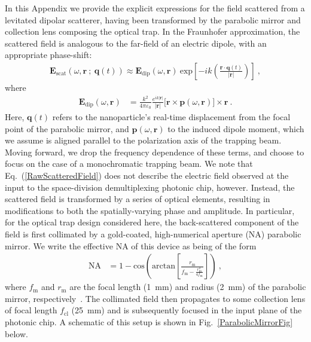 \documentclass[%
 reprint,
 amsmath,amssymb,
 aps,
pra,
]{revtex4-2}
\begin{document}
\noindent In this Appendix we provide the explicit expressions for the field scattered from a levitated dipolar scatterer, having been transformed by the parabolic mirror and collection lens composing the optical trap. In the Fraunhofer approximation, the scattered field is analogous to the far-field of an electric dipole, with an appropriate phase-shift:
\begin{align}\label{RawScatteredField}
    \boldsymbol{E}_{\mathrm{scat}}(\omega, \boldsymbol{r} ~;~ \boldsymbol{q}(t)) \approx \boldsymbol{E}_{\mathrm{dip}}(\omega, \boldsymbol{r})~\mathrm{exp}\left[-ik\left(\frac{\boldsymbol{r}\cdot\boldsymbol{q}(t)}{|\boldsymbol{r}|}\right)\right] ~ ,
\end{align}
where
\begin{align}
    \boldsymbol{E}_{\mathrm{dip}}(\omega, \boldsymbol{r}) &= \frac{k^{2}}{4\pi\varepsilon_{0}} \frac{e^{ik|\boldsymbol{r}|}}{|\boldsymbol{r}|}\big[\boldsymbol{r}\times\boldsymbol{p}(\omega, \boldsymbol{r})\big]\times\boldsymbol{r} ~ .
\end{align}
Here, $\boldsymbol{q}(t)$ refers to the nanoparticle's real-time displacement from the focal point of the parabolic mirror, and $\boldsymbol{p}(\omega, \boldsymbol{r})$ to the induced dipole moment, which we assume is aligned parallel to the polarization axis of the trapping beam. Moving forward, we drop the frequency dependence of these terms, and choose to focus on the case of a monochromatic trapping beam. We note that Eq.~(\ref{RawScatteredField}) does not describe the electric field observed at the input to the space-division demultiplexing photonic chip, however. Instead, the scattered field is transformed by a series of optical elements, resulting in modifications to both the spatially-varying phase and amplitude. In particular, for the optical trap design considered here, the back-scattered component of the field is first collimated by a gold-coated, high-numerical aperture (NA) parabolic mirror. We write the effective NA of this device as being of the form
\begin{align}
    \mathrm{NA} &= 1 - \mathrm{cos}\left(\mathrm{arctan}\left[\frac{r_{\mathrm{m}}}{f_{\mathrm{m}} - \frac{r_{\mathrm{m}}^{2}}{4f_{\mathrm{m}}}}\right]\right) ~ , 
\end{align}
where $f_{\mathrm{m}}$ and $r_{\mathrm{m}}$ are the focal length (1~mm) and radius (2~mm) of the parabolic mirror, respectively~\cite{vovrosh_parametric_2017}. The collimated field then propagates to some collection lens of focal length $f_{\mathrm{cl}}$ (25~mm) and is subsequently focused in the input plane of the photonic chip. A schematic of this setup is shown in Fig.~\ref{ParabolicMirrorFig} below.
\end{document}
